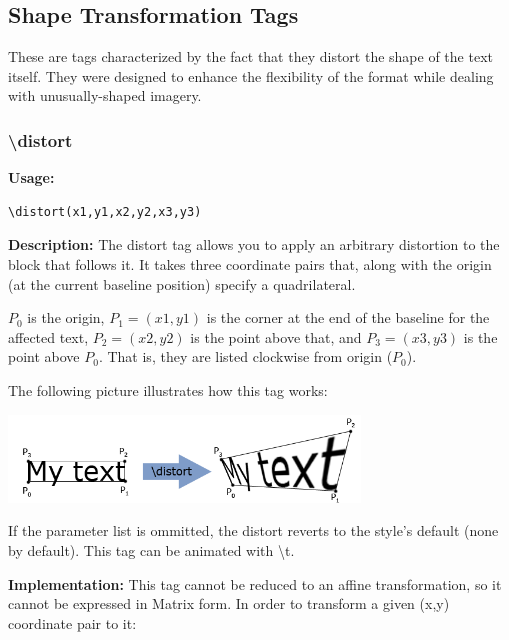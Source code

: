 \documentclass{spec}
\begin{document}
\subsection{Shape Transformation Tags}
These are tags characterized by the fact that they distort the shape of the text itself. They
were designed to enhance the flexibility of the format while dealing with unusually-shaped
imagery.

\subsubsection{\textbackslash distort}

\textbf{Usage:}
\begin{verbatim}
\distort(x1,y1,x2,y2,x3,y3)
\end{verbatim}

\textbf{Description:}
The distort tag allows you to apply an arbitrary distortion to the block that follows it.
It takes three coordinate pairs that, along with the origin (at the current baseline position)
specify a quadrilateral.

$P_0$ is the origin, $P_1 = (x1,y1)$ is the corner at the end of the baseline for the affected text,
$P_2 = (x2,y2)$ is the point above that, and $P_3 = (x3,y3)$ is the point above $P_0$. That is, they
are listed clockwise from origin ($P_0$).

The following picture illustrates how this tag works:\\
\begin{center}
\includegraphics[width=0.7\textwidth]{./distort}
\end{center}

If the parameter list is ommitted, the distort reverts to the style's default (none by default).
This tag can be animated with \textbackslash t.

\textbf{Implementation:}
This tag cannot be reduced to an affine transformation, so it cannot be expressed in Matrix form.
In order to transform a given (x,y) coordinate pair to it:
\end{document}
